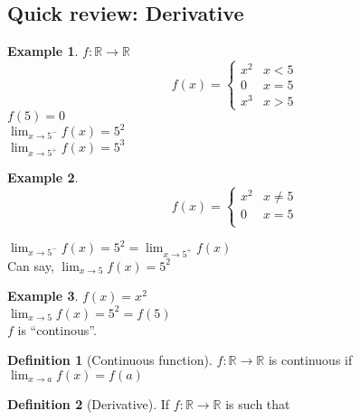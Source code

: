 \documentclass[twocolumn,20pt,fleqn]{extarticle}
\theoremstyle{plain}
\theoremstyle{definition}
\newtheorem*{definition}{Definition}
\newtheorem*{example}{Example}
\theoremstyle{remark}
\begin{document}
\clearpage



\subsection{Quick review: Derivative}
\begin{example}
  $f : \mathbb{R}\to \mathbb{R}$
  \[f(x) =
      \begin{cases}
        x^2 & x < 5\\
        0 & x = 5\\
        x^3 & x > 5
      \end{cases}
      \]
      $f(5)=0$\\
$\displaystyle\lim_{x \to 5^-} f(x)  = 5^2$\\
$\displaystyle\lim_{x \to 5^+} f(x)  = 5^3$
\end{example}


\begin{example}
  \[f(x) =
      \begin{cases}
        x^2 & x  \neq  5\\
        0 & x = 5\\
        
      \end{cases}
      \]
      
      


$\displaystyle\lim_{x \to 5^-} f(x) = 5^2  = \displaystyle\lim_{x \to 5^+} f(x)$\\
Can say, $\displaystyle\lim_{x \to 5} f(x) = 5^2$
\end{example}

\newpage
\begin{example}
$f(x) = x^2$\\
$\displaystyle\lim_{x \to 5} f(x) = 5^2 = f(5)$\\
$f$ is ``continous''.
\end{example}

\begin{definition}[Continuous function]
$f : \mathbb{R} \to \mathbb{R}$ is continuous if $\displaystyle\lim_{x \to a} f(x) = f(a)$
\end{definition}

\begin{definition}[Derivative]
  If $f : \mathbb{R}\to \mathbb{R}$ is such that\end{definition}


\clearpage
\end{document}

